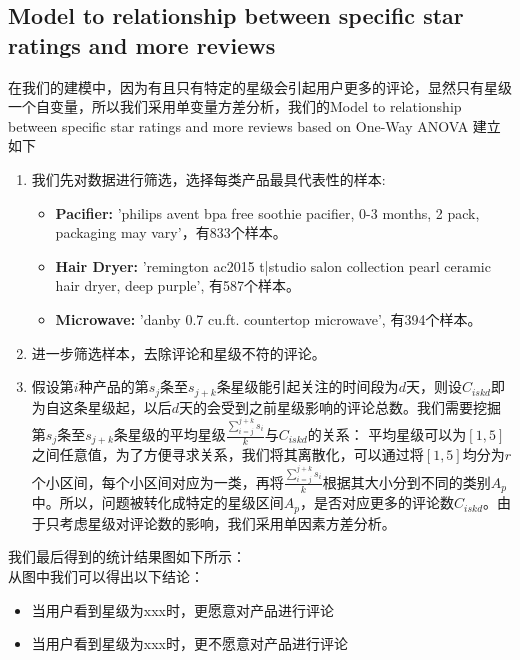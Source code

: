 \documentclass{mcmthesis}
\begin{document}
\subsection{Model to relationship between specific star ratings and more reviews}
在我们的建模中，因为有且只有特定的星级会引起用户更多的评论，显然只有星级一个自变量，所以我们采用单变量方差分析，我们的Model to relationship between specific star ratings and more reviews based on One-Way ANOVA 建立如下\\
\begin{enumerate}
	\item 我们先对数据进行筛选，选择每类产品最具代表性的样本:
	\begin{itemize}
		\item \textbf{Pacifier: }'philips avent bpa free soothie pacifier, 0-3 months, 2 pack, packaging may vary'，有833个样本。
		\item \textbf{Hair Dryer: }'remington ac2015 t|studio salon collection pearl ceramic hair dryer, deep purple', 有587个样本。
		\item \textbf{Microwave: }'danby 0.7 cu.ft. countertop microwave', 有394个样本。
	\end{itemize}
	\item 进一步筛选样本，去除评论和星级不符的评论。
	\item 假设第$i$种产品的第$s_j$条至$s_{j+k}$条星级能引起关注的时间段为$d$天，则设$C_{iskd}$即为自这条星级起，以后$d$天的会受到之前星级影响的评论总数。我们需要挖掘第$s_j$条至$s_{j+k}$条星级的平均星级$\frac{\sum_{i=j}^{j+k}s_i}{k}$与$C_{iskd}$的关系：
	平均星级可以为$[1,5]$之间任意值，为了方便寻求关系，我们将其离散化，可以通过将$[1,5]$均分为$r$个小区间，每个小区间对应为一类，再将$\frac{\sum_{i=j}^{j+k}s_i}{k}$根据其大小分到不同的类别$A_p$中。所以，问题被转化成特定的星级区间$A_p$，是否对应更多的评论数$C_{iskd}$。由于只考虑星级对评论数的影响，我们采用单因素方差分析。
\end{enumerate}
我们最后得到的统计结果图如下所示：\\

从图中我们可以得出以下结论：
\begin{itemize}
	\item 当用户看到星级为xxx时，更愿意对产品进行评论
	\item 当用户看到星级为xxx时，更不愿意对产品进行评论
\end{itemize}
\end{document}

